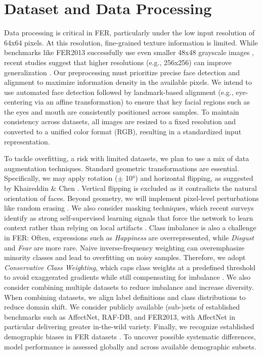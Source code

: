 \section{Dataset and Data Processing}
\label{sec:methodology}

Data processing is critical in FER, particularly under the low input resolution of 64x64 pixels. At this resolution, fine-grained texture information is limited. While benchmarks like FER2013 successfully use even smaller 48x48 grayscale images \cite{khaireddin2021facialemotionrecognitionstate}, recent studies suggest that higher resolutions (e.g., 256x256) can improve generalization \cite{tutuianu2023benchmarking}. Our preprocessing must prioritize precise face detection and alignment to maximize information density in the available pixels. We intend to use automated face detection followed by landmark-based alignment (e.g., eye-centering via an affine transformation) to ensure that key facial regions such as the eyes and mouth are consistently positioned across samples. To maintain consistency across datasets, all images are resized to a fixed resolution and converted to a unified color format (RGB), resulting in a standardized input representation.

To tackle overfitting, a risk with limited datasets, we plan to use a mix of data augmentation techniques. Standard geometric transformations are essential. Specifically, we may apply rotation ($\pm$ 10°) and horizontal flipping, as suggested by Khaireddin \& Chen \cite{khaireddin2021facialemotionrecognitionstate}. Vertical flipping is excluded as it contradicts the natural orientation of faces. Beyond geometry, we will implement pixel-level perturbations like random erasing \cite{ramos-cosi2025realtime}. We also consider masking techniques, which recent surveys identify as strong self-supervised learning signals that force the network to learn context rather than relying on local artifacts \cite{li2023deep}. Class imbalance is also a challenge in FER: Often, expressions such as \textit{Happiness} are overrepresented, while \textit{Disgust} and \textit{Fear} are more rare. Naive inverse-frequency weighting can overemphasize minority classes and lead to overfitting on noisy samples. Therefore, we adopt \textit{Conservative Class Weighting}, which caps class weights at a predefined threshold to avoid exaggerated gradients while still compensating for imbalance \cite{mejiaescobar2023towards}. We also consider combining multiple datasets to reduce imbalance and increase diversity. When combining datasets, we align label definitions and class distributions to reduce domain shift. We consider publicly available (sub-)sets of established benchmarks such as AffectNet, RAF-DB, and FER2013, with AffectNet in particular delivering greater in-the-wild variety. Finally, we recognize established demographic biases in FER datasets \cite{gayamorey2025evaluating, ghotbi2022ethics}. To uncover possible systematic differences, model performance is assessed globally and across available demographic subsets.

